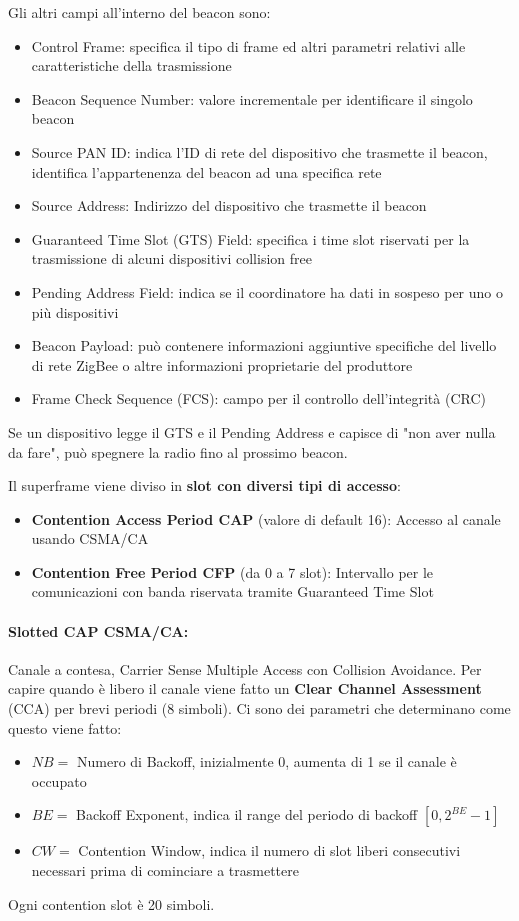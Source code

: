 Gli altri campi all'interno del beacon sono: 
\begin{itemize}
	\item Control Frame: specifica il tipo di frame ed altri parametri relativi alle caratteristiche della trasmissione
	\item Beacon Sequence Number: valore incrementale per identificare il singolo beacon
	\item Source PAN ID: indica l'ID di rete del dispositivo che trasmette il beacon, identifica l'appartenenza del beacon ad una specifica rete
	\item Source Address: Indirizzo del dispositivo che trasmette il beacon
	\item Guaranteed Time Slot (GTS) Field: specifica i time slot riservati per la trasmissione di alcuni dispositivi collision free
	\item Pending Address Field: indica se il coordinatore ha dati in sospeso per uno o più dispositivi
	\item Beacon Payload: può contenere informazioni aggiuntive specifiche del livello di rete ZigBee o altre informazioni proprietarie del produttore
	\item Frame Check Sequence (FCS): campo per il controllo dell'integrità (CRC)
\end{itemize}

Se un dispositivo legge il GTS e il Pending Address e capisce di "non aver nulla da fare", può spegnere la radio fino al prossimo beacon.

Il superframe viene diviso in \textbf{slot con diversi tipi di accesso}:
\begin{itemize}
	\item \textbf{Contention Access Period CAP} (valore di default 16): Accesso al canale usando CSMA/CA
	\item \textbf{Contention Free Period CFP} (da 0 a 7 slot): Intervallo per le comunicazioni con banda riservata tramite Guaranteed Time Slot
\end{itemize}

\paragraph{Slotted CAP CSMA/CA:} Canale a contesa, Carrier Sense Multiple Access con Collision Avoidance. Per capire quando è libero il canale viene fatto un \textbf{Clear Channel Assessment} (CCA) per brevi periodi (8 simboli). Ci sono dei parametri che determinano come questo viene fatto:
\begin{itemize}
	\item $NB=$ Numero di Backoff, inizialmente 0, aumenta di 1 se il canale è occupato
	\item $BE=$ Backoff Exponent, indica il range del periodo di backoff $[0, 2^{BE} - 1]$
	\item $CW=$ Contention Window, indica il numero di slot liberi consecutivi necessari prima di cominciare a trasmettere
\end{itemize}
Ogni contention slot è 20 simboli.

